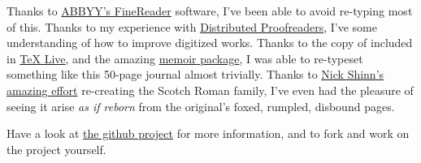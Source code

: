 Thanks to \href{http://abbyy.com}{ABBYY's FineReader} software, I've been able to avoid re-typing most of this. Thanks to my experience with \href{http://pgdp.net}{Distributed Proofreaders}, I've some understanding of how to improve digitized works. Thanks to the copy of \href{http://scripts.sil.org/cms/scripts/page.php?site_id=nrsi&id=xetex}{\XeLaTeX} included in \href{http://www.tug.org/texlive/}{TeX Live}, and the amazing \href{http://www.tex.ac.uk/CTAN/macros/latex2e/contrib/memoir/}{\textsf{memoir} package}, I was able to re-typeset something like this 50-page journal almost trivially. Thanks to \href{http://shinntype.com/}{Nick Shinn's amazing effort} re-creating the Scotch Roman family, I've even had the pleasure of seeing it arise \emph{as if reborn} from the original's foxed, rumpled, disbound  pages.

Have a look at \href{http://github.com/Vaguery/collegeJournalOfMedicalScienceSeptember1857}{the github project} for more information, and to fork and work on the project yourself.